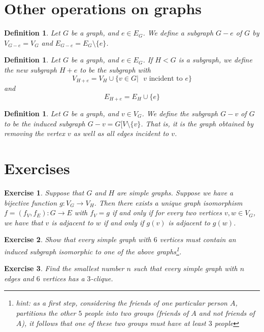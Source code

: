 \documentclass[12pt]{report}
\theoremstyle{plain}
\newtheorem{defn}[thm]{Definition}
\newtheorem{exercise}{Exercise}[section]
\begin{document}
\section{Other operations on graphs}

\begin{defn}
Let $G$ be a graph, and $e \in E_G$. We define a subgraph $G - e$ of $G$ by
$V_{G - e} = V_G$ and $E_{G - e} = E_G \setminus \{e\}$.
\end{defn}

\begin{defn}
Let $G$ be a graph, and $e \in E_G$. If $H < G$ is a subgraph, we define
the new subgraph $H + e$ to be the subgraph with
\[V_{H + e} = V_H \cup \{v \in G | \text{ $v$ incident to $e$}\}\]
and
\[E_{H + e} = E_H \cup \{e\}\]
\end{defn}

\begin{defn}
Let $G$ be a graph, and $v \in V_G$. We define the subgraph $G - v$ of $G$
to be the induced subgraph $G - v = G[V \setminus \{v \}$. That is, it is
the graph obtained by removing the vertex $v$ as well as all edges incident
to $v$.
\end{defn}

\section{Exercises}

\begin{exercise}
Suppose that $G$ and $H$ are simple graphs. Suppose we have a bijective
function $g: V_G \to V_H$. Then there exists a unique graph isomorphism $f
= (f_V, f_E) : G \to E$ with $f_V = g$ if and only if for every two
vertices $v, w \in V_G$, we have that $v$ is adjacent to $w$ if and only if
$g(v)$ is adjacent to $g(w)$.
\end{exercise}

\begin{exercise}
Show that every simple graph with $6$ vertices must contain an induced
subgraph isomorphic to one of the above graphs\footnote{hint: as a first
step, considering
the friends of one particular person $A$, partitions the other $5$ people into
two groups (friends of $A$ and not friends of $A$), it follows that one of
these two groups must have at least $3$ people}.
\end{exercise}

\begin{exercise} \label{ramsey 6}
Find the smallest number $n$ such that every simple graph with $n$ edges
and $6$ vertices has a $3$-clique.
\end{exercise}
\end{document}
